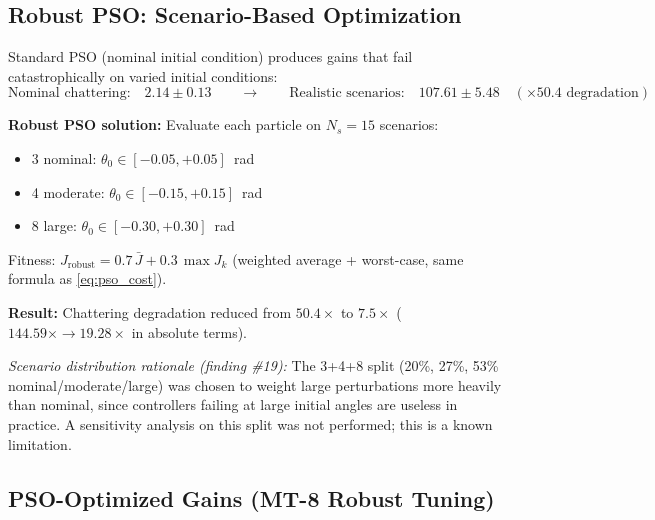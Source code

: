 \documentclass[11pt, a4paper]{article}
\begin{document}
\subsection{Robust PSO: Scenario-Based Optimization}
\label{sec:robustpso}

Standard PSO (nominal initial condition) produces gains that fail catastrophically
on varied initial conditions:
\begin{equation}
  \text{Nominal chattering:} \quad 2.14 \pm 0.13
  \qquad\longrightarrow\qquad
  \text{Realistic scenarios:} \quad 107.61 \pm 5.48
  \quad (\times 50.4 \text{ degradation})
\end{equation}

\textbf{Robust PSO solution:} Evaluate each particle on $N_s = 15$ scenarios:
\begin{itemize}[noitemsep]
  \item 3 nominal: $\theta_0 \in [-0.05, +0.05]$~rad
  \item 4 moderate: $\theta_0 \in [-0.15, +0.15]$~rad
  \item 8 large: $\theta_0 \in [-0.30, +0.30]$~rad
\end{itemize}
Fitness: $J_\text{robust} = 0.7\,\bar{J} + 0.3\,\max J_k$
(weighted average + worst-case, same formula as \eqref{eq:pso_cost}).

\textbf{Result:} Chattering degradation reduced from $50.4\times$ to $7.5\times$
($144.59\times \rightarrow 19.28\times$ in absolute terms).

\textit{Scenario distribution rationale (finding \#19):}
The 3+4+8 split (20\%, 27\%, 53\% nominal/moderate/large) was chosen to
weight large perturbations more heavily than nominal, since controllers
failing at large initial angles are useless in practice. A sensitivity
analysis on this split was not performed; this is a known limitation.

\subsection{PSO-Optimized Gains (MT-8 Robust Tuning)}
\end{document}
